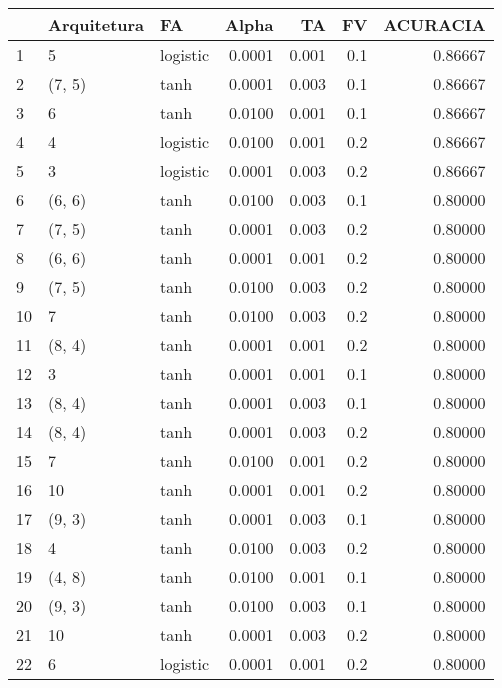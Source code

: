 \begin{tabular}{lllrrrr}
\toprule
{} & Arquitetura &        FA &   Alpha &     TA &   FV &  ACURACIA \\
\midrule
1   &           5 &  logistic &  0.0001 &  0.001 &  0.1 &   0.86667 \\
2   &      (7, 5) &      tanh &  0.0001 &  0.003 &  0.1 &   0.86667 \\
3   &           6 &      tanh &  0.0100 &  0.001 &  0.1 &   0.86667 \\
4   &           4 &  logistic &  0.0100 &  0.001 &  0.2 &   0.86667 \\
5   &           3 &  logistic &  0.0001 &  0.003 &  0.2 &   0.86667 \\
6   &      (6, 6) &      tanh &  0.0100 &  0.003 &  0.1 &   0.80000 \\
7   &      (7, 5) &      tanh &  0.0001 &  0.003 &  0.2 &   0.80000 \\
8   &      (6, 6) &      tanh &  0.0001 &  0.001 &  0.2 &   0.80000 \\
9   &      (7, 5) &      tanh &  0.0100 &  0.003 &  0.2 &   0.80000 \\
10  &           7 &      tanh &  0.0100 &  0.003 &  0.2 &   0.80000 \\
11  &      (8, 4) &      tanh &  0.0001 &  0.001 &  0.2 &   0.80000 \\
12  &           3 &      tanh &  0.0001 &  0.001 &  0.1 &   0.80000 \\
13  &      (8, 4) &      tanh &  0.0001 &  0.003 &  0.1 &   0.80000 \\
14  &      (8, 4) &      tanh &  0.0001 &  0.003 &  0.2 &   0.80000 \\
15  &           7 &      tanh &  0.0100 &  0.001 &  0.2 &   0.80000 \\
16  &          10 &      tanh &  0.0001 &  0.001 &  0.2 &   0.80000 \\
17  &      (9, 3) &      tanh &  0.0001 &  0.003 &  0.1 &   0.80000 \\
18  &           4 &      tanh &  0.0100 &  0.003 &  0.2 &   0.80000 \\
19  &      (4, 8) &      tanh &  0.0100 &  0.001 &  0.1 &   0.80000 \\
20  &      (9, 3) &      tanh &  0.0100 &  0.003 &  0.1 &   0.80000 \\
21  &          10 &      tanh &  0.0001 &  0.003 &  0.2 &   0.80000 \\
22  &           6 &  logistic &  0.0001 &  0.001 &  0.2 &   0.80000 \\

\end{tabular}
